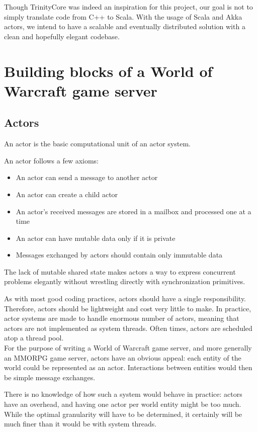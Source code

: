 \documentclass[paper=a4, fontsize=11pt]{scrartcl}
\begin{document}
Though TrinityCore was indeed an inspiration for this project, our goal is not
to simply translate code from C++ to Scala.
With the usage of Scala and Akka actors, we intend to have a scalable and
eventually distributed solution with a clean and hopefully elegant codebase.


\section{Building blocks of a World of Warcraft game server}

\subsection{Actors}

An actor is the basic computational unit of an actor system.

An actor follows a few axioms:
\begin{itemize}
    \item An actor can send a message to another actor
    \item An actor can create a child actor
    \item An actor's received messages are stored in a mailbox and processed one
        at a time
    \item An actor can have mutable data only if it is private
    \item Messages exchanged by actors should contain only immutable data
\end{itemize}

The lack of mutable shared state makes actors a way to express concurrent
problems elegantly without wrestling directly with synchronization primitives.

As with most good coding practices, actors should have a single responsibility.
Therefore, actors should be lightweight and cost very little to make.
In practice, actor systems are made to handle enormous number of actors, meaning
that actors are not implemented as system threads. Often times, actors are
scheduled atop a thread pool.\\

For the purpose of writing a World of Warcraft game server, and more generally
an MMORPG game server, actors have an obvious appeal: each entity of the world
could be represented as an actor.
Interactions between entities would then be simple message exchanges.

There is no knowledge of how such a system would behave in practice: actors
have an overhead, and having one actor per world entity might be too much.
While the optimal granularity will have to be determined, it certainly will be
much finer than it would be with system threads.
\end{document}
